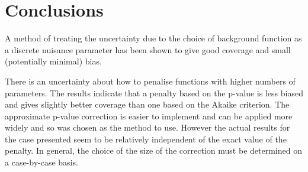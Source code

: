 \section{Conclusions} %
\label{sec:conclusions}

A method of treating the uncertainty due to the choice of background function
as a discrete nuisance parameter has been shown to give good coverage and
small (potentially minimal) bias.

There is an uncertainty about how to penalise functions with higher numbers
of parameters. The results indicate that a penalty based on the p-value
is less biased and gives slightly better coverage than one based on the
Akaike criterion. The approximate p-value correction is easier to implement and
can be applied more widely and so was chosen as the method to use.
However the actual results for the case presented
seem to be relatively independent of the exact value of the penalty.
In general, the choice of the size of the correction must be determined
on a case-by-case basis.


